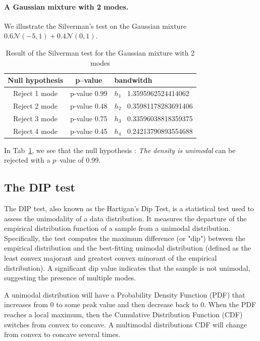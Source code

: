 \paragraph{A Gaussian mixture with 2 modes.} We illustrate the Silverman's test on the Gaussian mixture $0.6\mathcal{N}(-5,1)+0.4\mathcal{N}(0,1)$.
\begin{table}
\centering
\begin{tabular}{c|c|l}
Null hypothesis & p--value & bandwitdh \\
\hline
Reject 1 mode & p-value 0.99  & $h_1$ \, 1.3595962524414062 \\
Reject 2 mode & p-value 0.48  & $h_2$ \, 0.35981178283691406 \\
Reject 3 mode & p-value 0.75  & $h_3$ \, 0.33596038818359375 \\
Reject 4 mode & p-value 0.45  & $h_4$ \, 0.24213790893554688 \\
\end{tabular}
\caption{Result of the Silverman test for the Gaussian mixture with 2 modes}
\label{tab:silver_gm_2mod}
\end{table}
In Tab~\ref{tab:silver_gm_2mod}, we see that the null hypothesis : \textit{The density is unimodal} can be rejected with a $p$--value of 0.99. 

\subsection{The DIP test}

The DIP test, also known as the Hartigan's Dip Test, is a statistical test used to assess the unimodality of a data distribution. It measures the departure of the empirical distribution function of a sample from a unimodal distribution. Specifically, the test computes the maximum difference (or "dip") between the empirical distribution and the best-fitting unimodal distribution (defined as the least convex majorant and greatest convex minorant of the empirical distribution). A significant dip value indicates that the sample is not unimodal, suggesting the presence of multiple modes.

A unimodal distribution will have a Probability Density Function (PDF) that increases from 0 to some peak value and then decrease back to 0. When the PDF reaches a local maximum, then the Cumulative Distribution Function (CDF) switches from convex to concave.
A multimodal distributions CDF will change from convex to concave several times.\\

